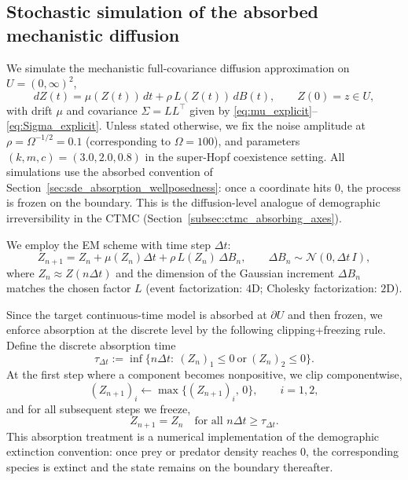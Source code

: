 \documentclass[pdflatex,sn-mathphys-ay]{sn-jnl}
\theoremstyle{thmstyleone}
\theoremstyle{definition}
\theoremstyle{remark}
\begin{document}
\subsection{Stochastic simulation of the absorbed mechanistic diffusion}
\label{subsec:numerics_sde}

We simulate the mechanistic full-covariance diffusion approximation on $U=(0,\infty)^2$,
\begin{equation}\label{eq:numerics_sde_model_A_rewrite}
dZ(t)=\mu(Z(t))\,dt+\rho\,L(Z(t))\,dB(t),\qquad Z(0)=z\in U,
\end{equation}
with drift $\mu$ and covariance $\Sigma=LL^\top$ given by \eqref{eq:mu_explicit}--\eqref{eq:Sigma_explicit}.
Unless stated otherwise, we fix the noise amplitude at $\rho=\Omega^{-1/2}=0.1$ (corresponding to $\Omega=100$),
and parameters $(k,m,c)=(3.0,2.0,0.8)$ in the super-Hopf coexistence setting.
All simulations use the absorbed convention of Section~\ref{sec:sde_absorption_wellposedness}: once a coordinate hits
$0$, the process is frozen on the boundary. This is the diffusion-level analogue of demographic irreversibility in
the CTMC (Section~\ref{subsec:ctmc_absorbing_axes}).

We employ the EM scheme with time step $\Delta t$:
\begin{equation}\label{eq:EM_update_A_rewrite}
Z_{n+1}=Z_n+\mu(Z_n)\Delta t+\rho\,L(Z_n)\,\Delta B_n,\qquad
\Delta B_n\sim \mathcal N(0,\Delta t\,I),
\end{equation}
where $Z_n\approx Z(n\Delta t)$ and the dimension of the Gaussian increment $\Delta B_n$ matches the chosen factor
$L$ (event factorization: $4$D; Cholesky factorization: $2$D).

Since the target continuous-time model is absorbed at $\partial U$ and then frozen, we enforce absorption at the
discrete level by the following clipping+freezing rule. Define the discrete absorption time
\[
\tau_{\Delta t}:=\inf\{n\Delta t:\ (Z_n)_1\le 0\ \text{or}\ (Z_n)_2\le 0\}.
\]
At the first step where a component becomes nonpositive, we clip componentwise,
\[
(Z_{n+1})_i \leftarrow \max\{(Z_{n+1})_i,\,0\},\qquad i=1,2,
\]
and for all subsequent steps we freeze,
\[
Z_{n+1}=Z_n\quad\text{for all }n\Delta t\ge \tau_{\Delta t}.
\]
This absorption treatment is a numerical implementation of the demographic extinction convention: once prey or
predator density reaches $0$, the corresponding species is extinct and the state remains on the boundary thereafter.
\end{document}
